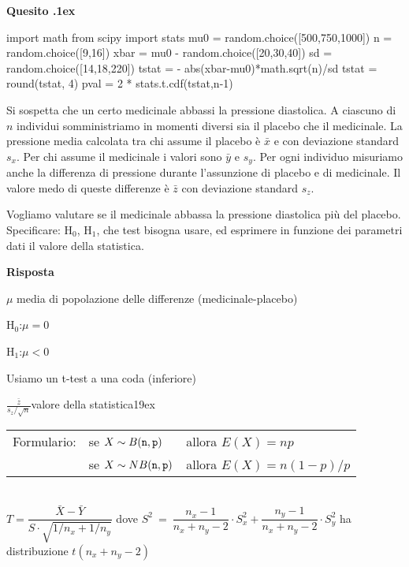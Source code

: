 \documentclass[11pt,twoside,a4paper]{article}
\newcounter{quesito}
\newenvironment{question}{\addtocounter{quesito}{1}\par\textbf{Quesito \thequesito.\kern1ex}}{\vspace{0.5\parskip}}
\newenvironment{answer}{\par\textbf{Risposta\quad}}{\vspace{\parskip}}
\begin{document}
\begin{question}
\begin{pycode}
import math
from scipy import stats
mu0 = random.choice([500,750,1000])
n = random.choice([9,16])
xbar = mu0 - random.choice([20,30,40])
sd = random.choice([14,18,220])
tstat = - abs(xbar-mu0)*math.sqrt(n)/sd
tstat = round(tstat, 4)
pval = 2 * stats.t.cdf(tstat,n-1)
\end{pycode}
Si sospetta che un certo medicinale abbassi la pressione diastolica. A ciascuno di $n$ individui somministriamo in momenti diversi sia il placebo che il medicinale. La pressione media calcolata tra chi assume il placebo è $\bar x$ e con deviazione standard $s_x$. Per chi assume il medicinale i valori sono  $\bar y$ e $s_y$. Per ogni individuo misuriamo anche la differenza di pressione durante l'assunzione di placebo e di medicinale. Il valore medo di queste differenze è $\bar z$ con deviazione standard $s_z$.

Vogliamo valutare se il medicinale abbassa la pressione diastolica più del placebo. Specificare: H$_0$, H$_1$, che test bisogna usare, ed esprimere in funzione dei parametri dati il valore della statistica.

\begin{answer}

  $\mu$  media di popolazione delle differenze (medicinale-placebo)
  
  {\color{blue}H$_0$:\quad $\mu = 0$}
  
  {\color{blue}H$_1$:\quad $\mu<0$}
  
  {\color{blue}Usiamo un t-test a una coda (inferiore)}
  
  {\color{blue}$\displaystyle\frac{\bar{z}}{s_z/\sqrt{n}}$\hfill valore della statistica}\kern19ex

\end{answer}
\end{question}








\vfill\hrulefill\par
\begin{tabular}{@{}lll}
Formulario:& se $X\sim B({\tt n},{\tt p})$ & allora $E(X)=np$\\
           & se $X\sim NB({\tt n},{\tt p})$& allora $E(X)=n(1-p)/p$\\
\end{tabular}
\\[1ex]
$T=\dfrac{\bar X-\bar Y}{S\cdot\sqrt{1/n_x+1/n_y}}$
\hfill dove
$S^2\ =\ \dfrac{n_x-1}{n_x+n_y-2}\cdot S_x^2 + \dfrac{n_y-1}{n_x+n_y-2}\cdot S_y^2$
\hfill
ha distribuzione $t(n_x+n_y-2)$\\
\end{document}
